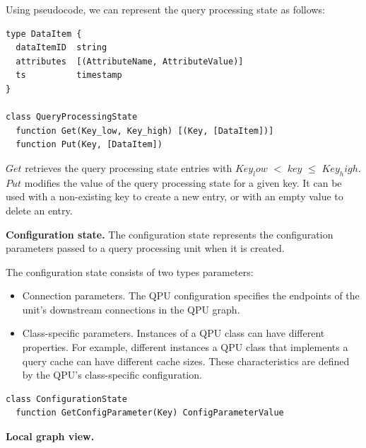 Using pseudocode, we can represent the query processing state as follows:

\begin{lstlisting}[caption={Pseudocode for the QPU's query processing state},captionpos=b,label={lst:qpustate}]
type DataItem {
  dataItemID  string
  attributes  [(AttributeName, AttributeValue)]
  ts          timestamp
}

class QueryProcessingState
  function Get(Key_low, Key_high) [(Key, [DataItem])]
  function Put(Key, [DataItem])
\end{lstlisting}

$Get$ retrieves the query processing state entries with $Key_low$ $<$ $key$ $\leq$ $Key_high$.
$Put$ modifies the value of the query processing state for a given key.
It can be used with a non-existing key to create a new entry, or with an empty value to delete an entry.

\medskip
\noindent
\textbf{Configuration state.}
The configuration state represents the configuration parameters passed to a query processing unit when it is created.

The configuration state consists of two types parameters:
\begin{itemize}
  \item Connection parameters.
  The QPU configuration specifies the endpoints of the unit's downstream connections in the QPU graph.

  \item Class-specific parameters.
  Instances of a QPU class can have different properties.
  For example, different instances a QPU class that implements a query cache can have different cache sizes.
  These characteristics are defined by the QPU's class-specific configuration.

\end{itemize}

\begin{lstlisting}[caption={Pseudocode for the QPU's configuration state},captionpos=b,label={lst:qpuconfigstate}]
class ConfigurationState
  function GetConfigParameter(Key) ConfigParameterValue
\end{lstlisting}


\medskip
\noindent
\textbf{Local graph view.}

